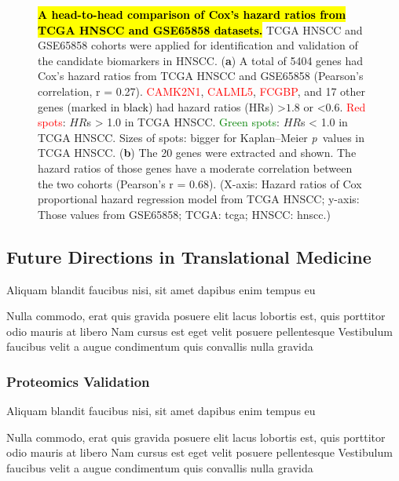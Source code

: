 \documentclass[
paper=landscape,
paper=160mm:90mm, %
fontsize=11pt, %
pagesize, %
parskip=half-, %
]{scrartcl} %
\newcommand{\bcaption}[2]{\caption{\textbf{#1} #2}}
\theoremstyle{mythmstyle} %
\begin{document}
\begin{figure}[H]
    \bcaption{\hl{A head-to-head comparison of Cox's hazard ratios from TCGA HNSCC and GSE65858 datasets.}}{TCGA HNSCC and GSE65858 cohorts were applied for identification and validation of the candidate biomarkers in HNSCC.
    (\textbf{a}) A total of 5404 genes had Cox's hazard ratios from TCGA HNSCC and GSE65858 (Pearson's correlation, r = 0.27).
    \textcolor{red}{CAMK2N1}, \textcolor{red}{CALML5}, \textcolor{red}{FCGBP}, and 17 other genes (marked in \textcolor{black}{black}) had hazard ratios (HRs) >$1.8$ or <$0.6$.
    \textcolor{red}{Red spots}: $HR$s > 1.0 in TCGA HNSCC.
    \textcolor{green}{Green spots}: $HR$s < 1.0 in TCGA HNSCC.
    Sizes of spots: bigger for Kaplan--Meier \textit{p}~values in TCGA HNSCC. %
    (\textbf{b}) The 20 genes were extracted and shown. The hazard ratios of those genes have a moderate correlation between the two cohorts (Pearson's r = 0.68).
    (X-axis: Hazard ratios of Cox proportional hazard regression model from TCGA HNSCC;
    y-axis: Those values from GSE65858; TCGA: \acrlong{tcga}; HNSCC: \acrlong{hnscc}.)
    }
    \label{fig:hazards_head2head_TCGA_GSE65858}
\end{figure}

\clearpage

\subsection{Future Directions in Translational Medicine}

\begin{outline}

\1 Aliquam blandit faucibus nisi, sit amet dapibus enim tempus eu

\2 Nulla commodo, erat quis gravida posuere
\1 elit lacus lobortis est, quis porttitor odio mauris at libero
\1 Nam cursus est eget velit posuere pellentesque
\1 Vestibulum faucibus velit a augue condimentum quis convallis nulla gravida

\end{outline}


\clearpage

\subsubsection{Proteomics Validation}

\begin{outline}

\1 Aliquam blandit faucibus nisi, sit amet dapibus enim tempus eu

\2 Nulla commodo, erat quis gravida posuere
\1 elit lacus lobortis est, quis porttitor odio mauris at libero
\1 Nam cursus est eget velit posuere pellentesque
\1 Vestibulum faucibus velit a augue condimentum quis convallis nulla gravida

\end{outline}
\end{document}
